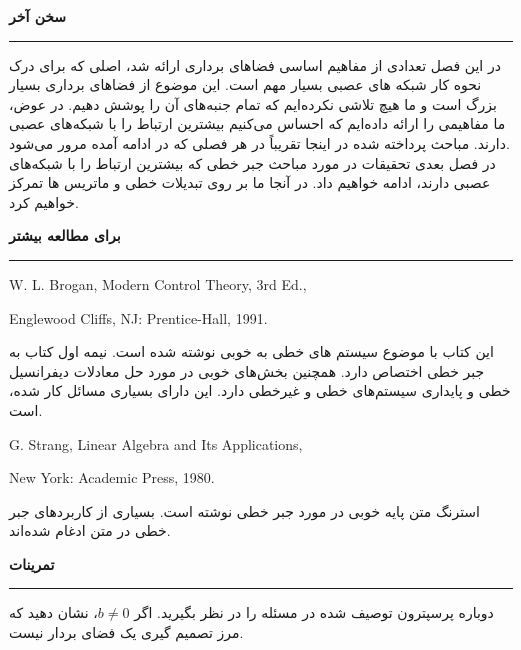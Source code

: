 \documentclass[a4paper,12pt]{report}
\begin{document}
	\noindent\textbf{\Large{سخن آخر}}
	\hrule \vspace{0.3cm}     	  
	
	در این فصل تعدادی از مفاهیم اساسی فضاهای برداری ارائه شد، اصلی که برای درک نحوه کار شبکه های عصبی بسیار مهم است. این موضوع از فضاهای برداری بسیار بزرگ است و ما هیچ تلاشی نکرده‌ایم که تمام جنبه‌های آن را پوشش دهیم. در عوض، ما مفاهیمی را ارائه داده‌ایم که احساس می‌کنیم بیشترین ارتباط را با شبکه‌های عصبی دارند. مباحث پرداخته شده در اینجا تقریباً در هر فصلی که در ادامه آمده مرور می‌شود.\\
	
	در فصل بعدی تحقیقات در مورد مباحث جبر خطی که بیشترین ارتباط را با شبکه‌های عصبی دارند، ادامه خواهیم داد. در آنجا ما بر روی تبدیلات خطی و ماتریس ها تمرکز خواهیم کرد.
	\vspace{20cm}
	
	\noindent\textbf{\Large{برای مطالعه بیشتر}}
	\hrule \vspace{0.3cm}
	\hspace{-3cm}
	\begin{latin}
		\noindent[Brog91]\hspace{1cm}W. L. Brogan, Modern Control Theory, 3rd Ed.,
		
		\hspace{2.2cm}Englewood
		Cliffs, NJ: Prentice-Hall, 1991.
	\end{latin}
این کتاب با موضوع سیستم های خطی به خوبی نوشته شده است. نیمه اول کتاب به جبر خطی اختصاص دارد. همچنین بخش‌های خوبی در مورد حل معادلات دیفرانسیل خطی و پایداری سیستم‌های خطی و غیرخطی دارد. این دارای بسیاری مسائل کار شده، است.\\

	\begin{latin}
		\noindent[Stra76]\hspace{1cm}G. Strang, Linear Algebra and Its Applications, 
		
		\hspace{2cm}New York:
		Academic Press, 1980.
	\end{latin}
استرنگ متن پایه خوبی در مورد جبر خطی نوشته است. بسیاری از کاربردهای جبر خطی در متن ادغام شده‌اند.
	\vspace{20cm}
	
	\noindent\textbf{\Large{تمرینات}}
	\hrule \vspace{0.3cm}
	\hspace{-2.5cm}\textbf{}\hspace{0.6cm}
	دوباره پرسپترون توصیف شده در مسئله  را در نظر بگیرید. اگر 
	$ b \neq 0 $،
	 نشان دهید که مرز تصمیم گیری یک فضای بردار نیست.\\
	 
\end{document}
